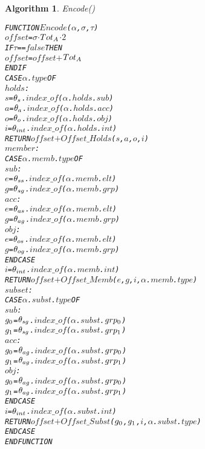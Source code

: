 \documentclass[11pt]{report}
\newenvironment{vverbatim}
{
  \begin{alltt}
}
{
    \vspace{-\baselineskip}
  \end{alltt}
}
\newtheorem{vvalgorithm}{Algorithm}[chapter]
\newenvironment{valgorithm}[2]
{
  \begin{vvalgorithm}{#1}
    \label{#2}
    \small
    \begin{vverbatim}
}
{
    \end{vverbatim}
  \end{vvalgorithm}
}
\begin{document}
        \begin{valgorithm}{Encode()}{algo-impln-encod}
FUNCTION \(Encode\)(\(\alpha\), \(\sigma\), \(\tau\))
  \(offset\) = \(\sigma\) \(\cdot\) \(Tot\sb{A}\) \(\cdot\) \(2\)
  IF \(\tau\) == \(false\) THEN
    \(offset\) = \(offset\) \(+\) \(Tot\sb{A}\)
  ENDIF
  CASE \(\alpha\).\(type\) OF
    \(holds\) :
      \(s\) = \(\theta\sb{s}\).\(index\_of\)(\(\alpha\).\(holds\).\(sub\))
      \(a\) = \(\theta\sb{a}\).\(index\_of\)(\(\alpha\).\(holds\).\(acc\))
      \(o\) = \(\theta\sb{o}\).\(index\_of\)(\(\alpha\).\(holds\).\(obj\))
      \(i\) = \(\theta\sb{int}\).\(index\_of\)(\(\alpha\).\(holds\).\(int\))
      RETURN \(offset\) \(+\) \(Offset\_Holds\)(\(s\), \(a\), \(o\), \(i\))
    \(member\) :
      CASE \(\alpha\).\(memb\).\(type\) OF
        \(sub\) :
          \(e\) = \(\theta\sb{ss}\).\(index\_of\)(\(\alpha\).\(memb\).\(elt\))
          \(g\) = \(\theta\sb{sg}\).\(index\_of\)(\(\alpha\).\(memb\).\(grp\))
        \(acc\) :
          \(e\) = \(\theta\sb{as}\).\(index\_of\)(\(\alpha\).\(memb\).\(elt\))
          \(g\) = \(\theta\sb{ag}\).\(index\_of\)(\(\alpha\).\(memb\).\(grp\))
        \(obj\) :
          \(e\) = \(\theta\sb{os}\).\(index\_of\)(\(\alpha\).\(memb\).\(elt\))
          \(g\) = \(\theta\sb{og}\).\(index\_of\)(\(\alpha\).\(memb\).\(grp\))
      ENDCASE
      \(i\) = \(\theta\sb{int}\).\(index\_of\)(\(\alpha\).\(memb\).\(int\))
      RETURN \(offset\) \(+\) \(Offset\_Memb\)(\(e\), \(g\), \(i\), \(\alpha\).\(memb\).\(type\))
    \(subset\) :
      CASE \(\alpha\).\(subst\).\(type\) OF
        \(sub\) :
          \(g\sb{0}\) = \(\theta\sb{sg}\).\(index\_of\)(\(\alpha\).\(subst\).\(grp\sb{0}\))
          \(g\sb{1}\) = \(\theta\sb{sg}\).\(index\_of\)(\(\alpha\).\(subst\).\(grp\sb{1}\))
        \(acc\) :
          \(g\sb{0}\) = \(\theta\sb{ag}\).\(index\_of\)(\(\alpha\).\(subst\).\(grp\sb{0}\))
          \(g\sb{1}\) = \(\theta\sb{ag}\).\(index\_of\)(\(\alpha\).\(subst\).\(grp\sb{1}\))
        \(obj\) :
          \(g\sb{0}\) = \(\theta\sb{ag}\).\(index\_of\)(\(\alpha\).\(subst\).\(grp\sb{0}\))
          \(g\sb{1}\) = \(\theta\sb{ag}\).\(index\_of\)(\(\alpha\).\(subst\).\(grp\sb{1}\))
      ENDCASE
      \(i\) = \(\theta\sb{int}\).\(index\_of\)(\(\alpha\).\(subst\).\(int\))
      RETURN \(offset\) \(+\) \(Offset\_Subst\)(\(g\sb{0}\), \(g\sb{1}\), \(i\), \(\alpha\).\(subst\).\(type\))
  ENDCASE
ENDFUNCTION
        \end{valgorithm}
\end{document}
